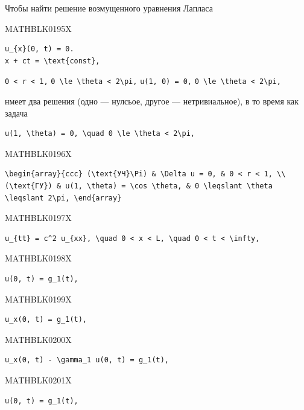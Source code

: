 \documentclass[
  ukrainian,
]{article}
\begin{document}
Чтобы найти решение возмущенного уравнения Лапласа

MATHBLK0195X

\begin{verbatim}
u_{x}(0, t) = 0.
x + ct = \text{const},
\end{verbatim}

\texttt{0\ \textless{}\ r\ \textless{}\ 1,}
\texttt{0\ \textbackslash{}le\ \textbackslash{}theta\ \textless{}\ 2\textbackslash{}pi,}
\texttt{u(1,\ 0)\ =\ 0,}
\texttt{0\ \textbackslash{}le\ \textbackslash{}theta\ \textless{}\ 2\textbackslash{}pi,}

нмеет два решения (одно --- нулсьое, другое --- нетривиальное), в то
время как задача

\begin{verbatim}
u(1, \theta) = 0, \quad 0 \le \theta < 2\pi,
\end{verbatim}

MATHBLK0196X

\begin{verbatim}
\begin{array}{ccc} (\text{УЧ}\Pi) & \Delta u = 0, & 0 < r < 1, \\ (\text{ГУ}) & u(1, \theta) = \cos \theta, & 0 \leqslant \theta \leqslant 2\pi, \end{array}
\end{verbatim}

MATHBLK0197X

\begin{verbatim}
u_{tt} = c^2 u_{xx}, \quad 0 < x < L, \quad 0 < t < \infty,
\end{verbatim}

MATHBLK0198X

\begin{verbatim}
u(0, t) = g_1(t),
\end{verbatim}

MATHBLK0199X

\begin{verbatim}
u_x(0, t) = g_1(t),
\end{verbatim}

MATHBLK0200X

\begin{verbatim}
u_x(0, t) - \gamma_1 u(0, t) = g_1(t),
\end{verbatim}

MATHBLK0201X

\begin{verbatim}
u(0, t) = g_1(t),
\end{verbatim}
\end{document}
